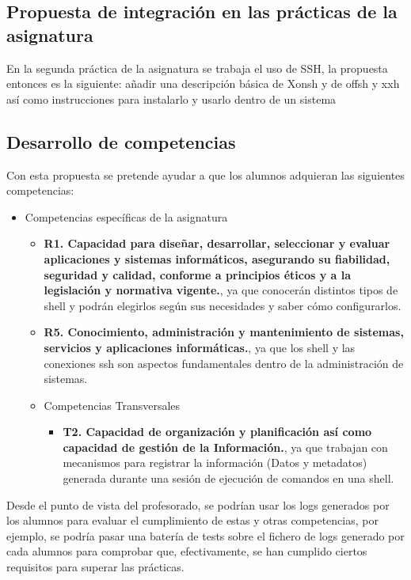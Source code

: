 \subsection{Propuesta de integración en las prácticas de la asignatura}

En la segunda práctica de la asignatura se trabaja el uso de SSH, la propuesta entonces es la siguiente: añadir una descripción básica de Xonsh y de offsh y xxh así como instrucciones para instalarlo y usarlo dentro de un sistema

\subsection{Desarrollo de competencias}

Con esta propuesta se pretende ayudar a que los alumnos adquieran las siguientes competencias:

\begin{itemize}
    \item Competencias específicas de la asignatura
    \begin{itemize}
        \item \textbf{R1. Capacidad para diseñar, desarrollar, seleccionar y evaluar aplicaciones y sistemas informáticos, asegurando su fiabilidad, seguridad y calidad, conforme a principios éticos y a la legislación y normativa vigente.}, ya que conocerán distintos tipos de shell y podrán elegirlos según sus necesidades y saber cómo configurarlos.
        \item \textbf{R5. Conocimiento, administración y mantenimiento de sistemas, servicios y aplicaciones informáticas.}, ya que los shell y las conexiones ssh son aspectos fundamentales dentro de la administración de sistemas.
    \item Competencias Transversales
    \begin{itemize}
        \item \textbf{ T2. Capacidad de organización y planificación así como capacidad de gestión de la
Información.}, ya que trabajan con mecanismos para registrar la información (Datos y metadatos) generada durante una sesión de ejecución de comandos en una shell.
    \end{itemize}
    \end{itemize}
\end{itemize}

Desde el punto de vista del profesorado, se podrían usar los logs generados por los alumnos para evaluar el cumplimiento de estas y otras competencias, por ejemplo, se podría pasar una batería de tests sobre el fichero de logs generado por cada alumnos para comprobar que, efectivamente, se han cumplido ciertos requisitos para superar las prácticas.

